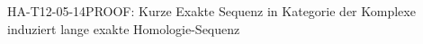 
\begin{REM}{HA-T12-05-14}{PROOF: Kurze Exakte Sequenz in Kategorie der Komplexe induziert lange exakte Homologie-Sequenz}
\end{REM}
